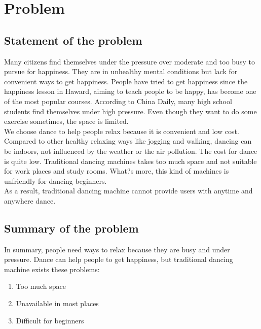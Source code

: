 \section{Problem}
\subsection{Statement of the problem}
\hspace*{2em}Many citizens find themselves under the pressure over moderate and too busy to pursue for happiness. They are in unhealthy mental conditions but lack for convenient ways to get happiness. People have tried to get happiness since the happiness lesson in Haward, aiming to teach people to be happy, has become one of the most popular courses. According to China Daily, many high school students find themselves under high pressure. Even though they want to do some exercise sometimes, the space is limited.\\
\hspace*{2em}We choose dance to help people relax because it is convenient and low cost. Compared to other healthy relaxing ways like jogging and walking, dancing can be indoors, not influenced by the weather or the air pollution. The cost for dance is quite low. Traditional dancing machines takes too much space and not suitable for work places and study rooms. What?s more, this kind of machines is unfriendly for dancing beginners.\\
\hspace*{2em}As a result, traditional dancing machine cannot provide users with anytime and anywhere dance. \\
\subsection{Summary of the problem}
\hspace*{2em}In summary, people need ways to relax because they are busy and under pressure. Dance can help people to get happiness, but traditional dancing machine exists these problems:
\begin{enumerate}[\hspace*{3em}(1)]
\item Too much space
\item Unavailable in most places
\item Difficult for beginners
\end{enumerate}